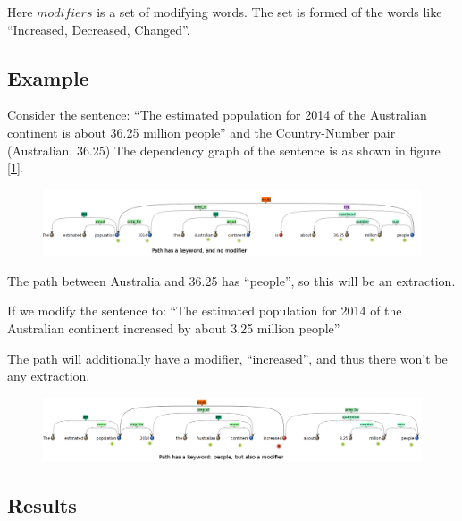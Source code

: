 \documentclass[a4paper,10pt]{article}
\begin{document}
Here $modifiers$ is a set of modifying words. The set is formed of the words like {``Increased, Decreased, 
Changed''}.

\subsection{Example}
Consider the sentence:
``The estimated population for 2014 of the Australian continent	is about 36.25 million people''
and the Country-Number pair (Australian, 36.25)
The dependency graph of the sentence is as shown in figure [\ref{pos}].
\begin{figure}[H]
 \centering
 \includegraphics[bb=0 0 1292 228,scale=0.3]{./dep_pos.png}
 \label{pos}
\end{figure}
The path between Australia and 36.25 has ``people'', so this will be an extraction.

If we modify the sentence to:
``The estimated population for 2014 of the Australian continent	increased by about 3.25 million people''

The path will additionally have a modifier, ``increased'', and thus there won't be any extraction.
\begin{figure}[H]
 \centering
 \includegraphics[bb=0 0 1292 228,scale=0.3]{./dep_neg.png}
 \label{neg}
\end{figure}




\subsection{Results}
\end{document}
